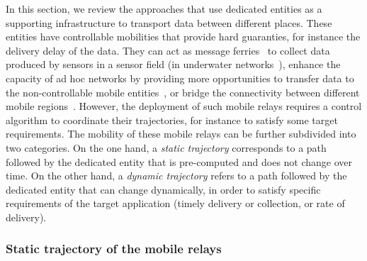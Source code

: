In this section, we review the approaches that use dedicated entities as a supporting infrastructure to transport data between different places. These entities have controllable mobilities that provide hard guaranties, for instance the delivery delay of the data. They can act as message ferries~\cite{zhao2004message} to collect data produced by sensors in a sensor field (\eg in underwater networks~\cite{partan2007survey}), enhance the capacity of ad hoc networks by providing more opportunities to transfer data to the non-controllable mobile entities~\cite{zhao2004message,burns2005mv}, or bridge the connectivity between different mobile regions~\cite{davis2001wearable,zhou2013minimizing}. However, the deployment of such mobile relays requires a control algorithm to coordinate their trajectories, for instance to satisfy some target requirements. The mobility of these mobile relays can be further subdivided into two categories. On the one hand, a \textit{static trajectory} corresponds to a path followed by the dedicated entity that is pre-computed and does not change over time. On the other hand, a \textit{dynamic trajectory} refers to a path followed by the dedicated entity that can change dynamically, in order to satisfy specific requirements of the target application (\eg timely delivery or collection, or rate of delivery).


\subsubsection{Static trajectory of the mobile relays}

